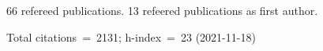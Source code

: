 66 refereed publications. 13 refeered publications as first author.

Total citations~=~2131; h-index~=~23 (2021-11-18)